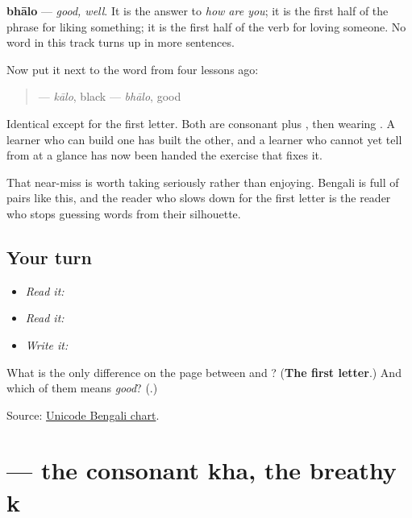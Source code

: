 \textbf{bhālo} — \emph{good, well}. It is the answer to \emph{how are you}; it is the first half of the phrase for liking something; it is the first half of the verb for loving someone. No word in this track turns up in more sentences.

Now put it next to the word from four lessons ago:

\begin{quote}
\textbf{} — \emph{kālo}, black \textbf{} — \emph{bhālo}, good
\end{quote}

Identical except for the first letter. Both are consonant plus \textbf{}, then \textbf{} wearing \textbf{}. A learner who can build one has built the other, and a learner who cannot yet tell \textbf{} from \textbf{} at a glance has now been handed the exercise that fixes it.

That near-miss is worth taking seriously rather than enjoying. Bengali is full of pairs like this, and the reader who slows down for the first letter is the reader who stops guessing words from their silhouette.

\subsection*{Your turn}
\begin{itemize}
\raggedright
  \item \emph{Read it:} 
  \item \emph{Read it:}  
  \item \emph{Write it:} 
\end{itemize}

\begin{tcolorbox}[breakable,colback=teal!4,colframe=teal!35!black,title={Before you move on}]
What is the only difference on the page between \textbf{} and \textbf{}? (\textbf{The first letter}.) And which of them means \emph{good}? (\textbf{}.)

Source: \href{https://www.unicode.org/charts/PDF/U0980.pdf}{Unicode Bengali chart}.
\end{tcolorbox}
\section[khô]{ — the consonant kha, the breathy k}

\label{lesson:BN-W03-kha}



